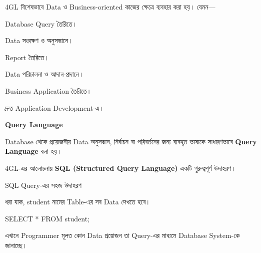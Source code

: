 
4GL বিশেষভাবে Data ও Business-oriented কাজের ক্ষেত্রে
ব্যবহার করা হয়। যেমন—

\begin{compacttwocolpoints}

\item Database Query তৈরিতে।

\item Data সংরক্ষণ ও অনুসন্ধানে।

\item Report তৈরিতে।

\item Data পরিচালনা ও আদান-প্রদানে।

\item Business Application তৈরিতে।

\item দ্রুত Application Development-এ।

\end{compacttwocolpoints}


\begin{definitionbox}

\textbf{\color{darkTeal}Query Language}

Database থেকে প্রয়োজনীয় Data অনুসন্ধান, নির্বাচন বা পরিবর্তনের
জন্য ব্যবহৃত ভাষাকে সাধারণভাবে
\textbf{Query Language} বলা হয়।

\end{definitionbox}

4GL-এর আলোচনায়
\textbf{SQL (Structured Query Language)}
একটি গুরুত্বপূর্ণ উদাহরণ।

\begin{examplebox}{SQL Query-এর সহজ উদাহরণ}

ধরা যাক, \textenglish{\ttfamily student} নামের Table-এর
সব Data দেখতে হবে।

\begin{codebox}

\begin{center}
{\textenglish{\ttfamily SELECT * FROM student;}}
\end{center}

\end{codebox}

এখানে Programmer মূলত কোন Data প্রয়োজন তা Query-এর মাধ্যমে
Database System-কে জানাচ্ছে।

\end{examplebox}

